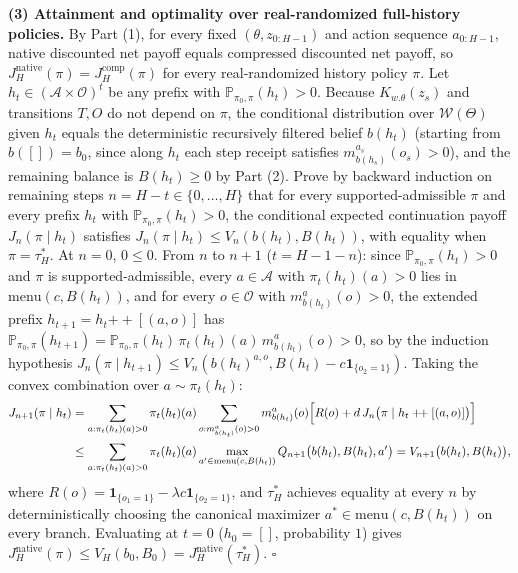 \documentclass[11pt,letterpaper]{article}
\begin{document}
\textbf{(3) Attainment and optimality over real-randomized full-history
policies.} By Part (1), for every fixed \((\theta, z_{0:H-1})\) and
action sequence \(a_{0:H-1}\), native discounted net payoff equals
compressed discounted net payoff, so
\(J_H^{\mathrm{native}}(\pi) = J_H^{\mathrm{comp}}(\pi)\) for every
real-randomized history policy \(\pi\). Let
\(h_t \in (\mathcal{A} \times \mathcal{O})^t\) be any prefix with
\(\mathbb{P}_{\pi_0, \pi}(h_t) > 0\). Because \(K_{w.\theta}(z_s)\) and
transitions \(T, O\) do not depend on \(\pi\), the conditional
distribution over \(\mathcal{W}(\Theta)\) given \(h_t\) equals the
deterministic recursively filtered belief \(b(h_t)\) (starting from
\(b([]) = b_0\), since along \(h_t\) each step receipt satisfies
\(m_{b(h_s)}^{a_s}(o_s) > 0\)), and the remaining balance is
\(B(h_t) \ge 0\) by Part (2). Prove by backward induction on remaining
steps \(n = H - t \in \{0, \dots, H\}\) that for every
supported-admissible \(\pi\) and every prefix \(h_t\) with
\(\mathbb{P}_{\pi_0, \pi}(h_t) > 0\), the conditional expected
continuation payoff \(J_n(\pi \mid h_t)\) satisfies
\(J_n(\pi \mid h_t) \le V_n(b(h_t), B(h_t))\), with equality when
\(\pi = \tau_H^*\). At \(n = 0\), \(0 \le 0\). From \(n\) to \(n+1\)
(\(t = H - 1 - n\)): since \(\mathbb{P}_{\pi_0, \pi}(h_t) > 0\) and
\(\pi\) is supported-admissible, every \(a \in \mathcal{A}\) with
\(\pi_t(h_t)(a) > 0\) lies in \(\mathrm{menu}(c, B(h_t))\), and for
every \(o \in \mathcal{O}\) with \(m_{b(h_t)}^a(o) > 0\), the extended
prefix \(h_{t+1} = h_t \mathbin{+\!+} [(a,o)]\) has
\(\mathbb{P}_{\pi_0, \pi}(h_{t+1}) = \mathbb{P}_{\pi_0, \pi}(h_t)\,\pi_t(h_t)(a)\,m_{b(h_t)}^a(o) > 0\),
so by the induction hypothesis
\(J_n(\pi \mid h_{t+1}) \le V_n(b(h_t)^{a,o}, B(h_t) - c\mathbf{1}_{\{o_2=1\}})\).
Taking the convex combination over \(a \sim \pi_t(h_t)\):
\[\begin{aligned}
J_{n+1}(\pi \mid h_t)
&= \sum_{a : \pi_t(h_t)(a) > 0} \pi_t(h_t)(a) \sum_{o : m_{b(h_t)}^a(o) > 0} m_{b(h_t)}^a(o)\Bigl[R(o) + d\, J_n\bigl(\pi \mid h_t \mathbin{+\!+} [(a,o)]\bigr)\Bigr] \\
&\le \sum_{a : \pi_t(h_t)(a) > 0} \pi_t(h_t)(a) \max_{a' \in \mathrm{menu}(c, B(h_t))} Q_{n+1}\bigl(b(h_t), B(h_t), a'\bigr) = V_{n+1}\bigl(b(h_t), B(h_t)\bigr),
\end{aligned}\] where
\(R(o) = \mathbf{1}_{\{o_1=1\}} - \lambda c \mathbf{1}_{\{o_2=1\}}\),
and \(\tau_H^*\) achieves equality at every \(n\) by deterministically
choosing the canonical maximizer \(a^* \in \mathrm{menu}(c, B(h_t))\) on
every branch. Evaluating at \(t = 0\) (\(h_0 = []\), probability \(1\))
gives
\(J_H^{\mathrm{native}}(\pi) \le V_H(b_0, B_0) = J_H^{\mathrm{native}}(\tau_H^*)\).
\(\square\)
\end{document}
